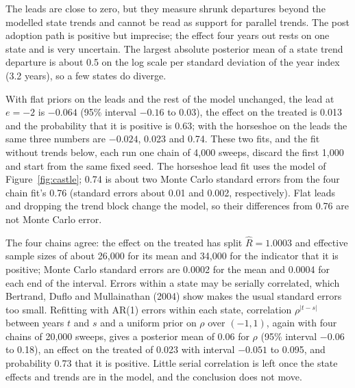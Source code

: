 The leads are close to zero, but they measure shrunk departures beyond the modelled state trends and cannot be read as support for parallel trends. The post adoption path is positive but imprecise; the effect four years out rests on one state and is very uncertain. The largest absolute posterior mean of a state trend departure is about 0.5 on the log scale per standard deviation of the year index (3.2 years), so a few states do diverge.

With flat priors on the leads and the rest of the model unchanged, the lead at $e = -2$ is $-0.064$ (95\% interval $-0.16$ to 0.03), the effect on the treated is 0.013 and the probability that it is positive is 0.63; with the horseshoe on the leads the same three numbers are $-0.024$, 0.023 and 0.74. These two fits, and the fit without trends below, each run one chain of 4,000 sweeps, discard the first 1,000 and start from the same fixed seed. The horseshoe lead fit uses the model of Figure~\ref{fig:castle}; 0.74 is about two Monte Carlo standard errors from the four chain fit's 0.76 (standard errors about 0.01 and 0.002, respectively). Flat leads and dropping the trend block change the model, so their differences from 0.76 are not Monte Carlo error.

The four chains agree: the effect on the treated has split $\hat R=1.0003$ and effective sample sizes of about 26,000 for its mean and 34,000 for the indicator that it is positive; Monte Carlo standard errors are 0.0002 for the mean and 0.0004 for each end of the interval. Errors within a state may be serially correlated, which Bertrand, Duflo and Mullainathan (2004) show makes the usual standard errors too small. Refitting with AR(1) errors within each state, correlation $\rho^{|t-s|}$ between years $t$ and $s$ and a uniform prior on $\rho$ over $(-1, 1)$, again with four chains of 20,000 sweeps, gives a posterior mean of 0.06 for $\rho$ (95\% interval $-0.06$ to 0.18), an effect on the treated of 0.023 with interval $-0.051$ to 0.095, and probability 0.73 that it is positive. Little serial correlation is left once the state effects and trends are in the model, and the conclusion does not move.

